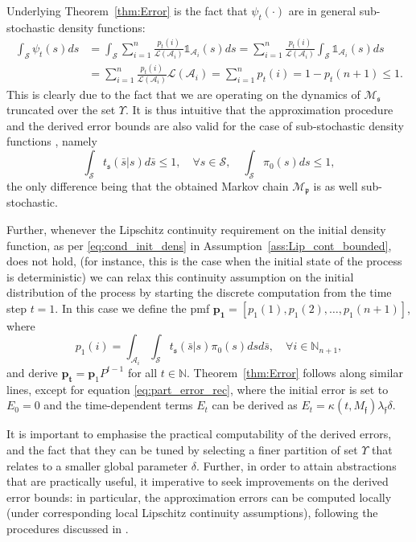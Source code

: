 \documentclass{LMCS}
\begin{document}
Underlying Theorem~\ref{thm:Error} is the fact that $\psi_t(\cdot)$ are in general sub-stochastic density functions:  
\begin{align*}
\int_{\mathcal S}\psi_t(s)ds 
& = \int_{\mathcal S}\sum_{i=1}^{n}\frac{p_t(i)}{\mathcal L(\mathcal A_i)}\mathds 1_{\mathcal A_i}(s)ds
= \sum_{i=1}^{n}\frac{p_t(i)}{\mathcal L(\mathcal A_i)}\int_{\mathcal S}\mathds 1_{\mathcal A_i}(s)ds\\
& = \sum_{i=1}^{n}\frac{p_t(i)}{\mathcal L(\mathcal A_i)}\mathcal L(\mathcal A_i) = \sum_{i=1}^{n}p_t(i)=1-p_t(n+1)\le 1.
\end{align*} 
This is clearly due to the fact that we are operating on the dynamics of $\mathscr M_{\mathfrak s}$ truncated over the set $\Upsilon$.  
It is thus intuitive that the approximation procedure and the derived error bounds are also valid for the case of sub-stochastic density functions \cite{AKNP14}, 
namely 
\begin{equation*}
\int_{\mathcal S}t_{\mathfrak s}(\bar s|s)d\bar s\le 1,\quad\forall s\in\mathcal S,\quad \int_{\mathcal S}\pi_0(s)ds\le 1, 
\end{equation*}
the only difference being that the obtained Markov chain $\mathscr M_{\mathfrak p}$ is as well sub-stochastic.  
 
Further, 
whenever the Lipschitz continuity requirement on the initial density function, as per \eqref{eq:cond_init_dens} in Assumption~\ref{ass:Lip_cont_bounded}, does not hold, 
(for instance, this is the case when the initial state of the process is deterministic)
we can relax this continuity assumption on the initial distribution of the process by starting the discrete computation from the time step $t=1$. 
In this case we define the pmf $\mathbf{p_1}= [p_1(1),p_1(2),\ldots,p_1(n+1)]$,
where
\begin{equation}
\label{eq:relax_cont}
p_1(i) = \int_{\mathcal A_i}\int_{\mathcal S}t_{\mathfrak s}(\bar s|s)\pi_0(s)ds d\bar s, \quad \forall i\in\mathbb N_{n+1},
\end{equation}
and derive $\mathbf{p_t} = \mathbf p_1 P^{t-1}$ for all $t\in\mathbb N$. 
Theorem~\ref{thm:Error} follows along similar lines, 
except for equation \eqref{eq:part_error_rec}, where the initial error is set to $E_0 = 0$ 
and the time-dependent terms $E_t$ can be derived as 
$E_t = \kappa(t,M_{\mathfrak f})\lambda_{\mathfrak f}\delta$.

It is important to emphasise the practical computability of the derived errors, 
and the fact that they can be tuned by selecting a finer partition of set $\Upsilon$ that relates to a smaller global parameter $\delta$. 
Further,
in order to attain abstractions that are practically useful, it imperative to seek improvements on the derived error bounds: 
in particular, the approximation errors can be computed locally (under corresponding local Lipschitz continuity assumptions), 
following the procedures discussed in \cite{SA13}.
\end{document}
